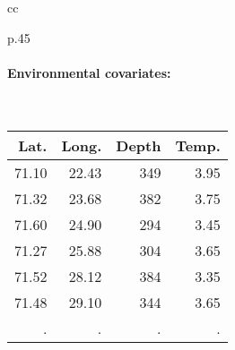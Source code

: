 \documentclass[8pt]{beamer}
\begin{document}
{\begin{tabular}{cc}
\begin{tabular}{p{}}
      \paragraph{Environmental covariates:} ~ \\
        {\footnotesize \begin{tabular}{rrrr}
        Lat. & Long. & Depth & Temp. \\
        \hline
        71.10 & 22.43 & 349 & 3.95 \\
        71.32 & 23.68 & 382 & 3.75 \\
        71.60 & 24.90 & 294 & 3.45 \\
        71.27 & 25.88 & 304 & 3.65 \\
        71.52 & 28.12 & 384 & 3.35 \\
        71.48 & 29.10 & 344 & 3.65 \\
        . & . & . & .
      \end{tabular}} 
    \end{tabular}
  \end{tabular}
  
}
\end{document}

